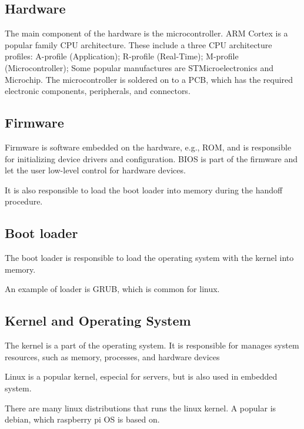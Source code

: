 \subsection{Hardware}
The main component of the hardware is the microcontroller.
ARM Cortex is a popular family CPU architecture.
These include a three CPU architecture profiles: A-profile (Application);
R-profile (Real-Time); M-profile (Microcontroller);
Some popular manufactures are STMicroelectronics and Microchip.
The microcontroller is soldered on to a PCB, which has the required 
electronic components, peripherals, and connectors.


\subsection{Firmware}
Firmware is software embedded on the hardware, e.g., ROM, and is responsible 
for initializing device drivers and configuration. BIOS is part of the firmware 
and let the user low-level control for hardware devices.

It is also responsible to load the boot loader into memory during 
the handoff procedure.



\subsection{Boot loader}
The boot loader is responsible to load the operating system with the kernel
into memory.

An example of loader is GRUB, which is common for linux.


\subsection{Kernel and Operating System}
The kernel is a part of the operating system. It is responsible for 
manages system resources, such as memory, processes, and hardware devices

Linux is a popular kernel, especial for servers, but is also used 
in embedded system.

There are many linux distributions that runs the linux kernel.
A popular is debian, which raspberry pi OS is based on.

